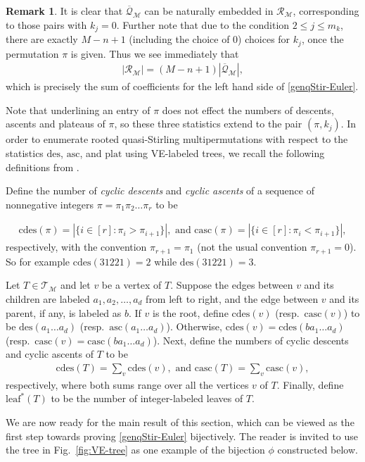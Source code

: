 \documentclass[11pt,reqno]{amsart}
\numberwithin{equation}{section}
\theoremstyle{plain}
\theoremstyle{definition}
\newtheorem{remark}{Remark}
\newcommand{\bQ}{\overline{\mathcal{Q}}}
\newcommand{\M}{\mathcal{M}}
\newcommand{\T}{\mathcal{T}}
\newcommand{\R}{\mathcal{R}}
\def\des{\mathrm{des}}
\def\asc{\mathrm{asc}}
\def\cdes{\mathrm{cdes}}
\def\casc{\mathrm{casc}}
\def\plat{\mathrm{plat}}
\def\lleaf{\mathrm{leaf}^*}
\begin{document}
\begin{remark}
It is clear that $\bQ_{\M}$ can be naturally embedded in $\R_{\M}$, corresponding to those pairs with $k_j=0$. Further note that due to the condition $2\le j\le m_k$, there are exactly $M-n+1$ (including the choice of $0$) choices for $k_j$, once the permutation $\pi$ is given. Thus we see immediately that
\begin{align}\label{R=bQ}
|\R_{\M}|=(M-n+1)|\bQ_{\M}|,
\end{align}
which is precisely the sum of coefficients for the left hand side of \eqref{genqStir-Euler}.  
\end{remark}

Note that underlining an entry of $\pi$ does not effect the numbers of descents, ascents and plateaus of $\pi$, so these three statistics extend to the pair $(\pi,k_j)$. In order to enumerate rooted quasi-Stirling multipermutations with respect to the statistics $\des$, $\asc$, and $\plat$ using VE-labeled trees, we recall the following definitions from \cite{Eli}.

Define the number of {\em cyclic descents} and {\em cyclic ascents} of a sequence of nonnegative integers $\pi=\pi_1\pi_2\ldots\pi_r$ to be

\begin{align*}
\cdes(\pi)=|\{i\in[r]:\pi_i>\pi_{i+1}\}|, \text{ and } \casc(\pi)=|\{i\in[r]:\pi_i<\pi_{i+1}\}|,
\end{align*} 
respectively, with the convention $\pi_{r+1}=\pi_1$ (not the usual convention $\pi_{r+1}=0$). So for example $\cdes(31221)=2$ while $\des(31221)=3$.

Let $T\in\T_{\M}$ and let $v$ be a vertex of $T$. Suppose the edges between $v$ and its children are labeled $a_1,a_2,\ldots,a_d$ from left to right, and the edge between $v$ and its parent, if any, is labeled as $b$. If $v$ is the root, define $\cdes(v)$ (resp.~$\casc(v)$) to be $\des(a_1\ldots a_d)$ (resp.~$\asc(a_1\ldots a_d)$). Otherwise, $\cdes(v)=\cdes(ba_1\ldots a_d)$ (resp.~$\casc(v)=\casc(ba_1\ldots a_d)$). Next, define the numbers of cyclic descents and cyclic ascents of $T$ to be
\begin{align*}
\cdes(T)=\sum_v \cdes(v), \text{ and } \casc(T)=\sum_v \casc(v),
\end{align*}
respectively, where both sums range over all the vertices $v$ of $T$. Finally, define $\lleaf(T)$ to be the number of integer-labeled leaves of $T$.

We are now ready for the main result of this section, which can be viewed as the first step towards proving \eqref{genqStir-Euler} bijectively. The reader is invited to use the tree in Fig.~\ref{fig:VE-tree} as one example of the bijection $\phi$ constructed below.
\end{document}
